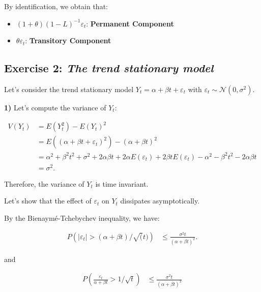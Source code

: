 \documentclass[
  a4paper]{article}
\begin{document}
By identification, we obtain that:

\begin{itemize}
    \item $(1 + \theta)(1 - L)^{-1} \varepsilon_t$: \textbf{Permanent Component}    
    \item $\theta \varepsilon_t$: \textbf{Transitory Component}
\end{itemize}

\hypertarget{exercise-2-the-trend-stationary-model}{%
\subsection{\texorpdfstring{Exercise 2: \emph{The trend stationary
model}}{Exercise 2: The trend stationary model}}\label{exercise-2-the-trend-stationary-model}}

Let's consider the trend stationary model
\(Y_t = \alpha + \beta t + \varepsilon_t\) with
\(\varepsilon_t \sim \mathcal{N}(0, \sigma^2)\).

\textbf{1)} Let's compute the variance of \(Y_t\):

\begin{align*}
V(Y_t) & = E(Y_t^2) - E(Y_t)^2 \\
       & = E((\alpha + \beta t + \varepsilon_t)^2) - (\alpha + \beta t)^2 \\
       & = \alpha^2 + \beta^2 t^2 + \sigma^2 + 2 \alpha \beta t + 2 \alpha E(\varepsilon_t) + 2 \beta t E(\varepsilon_t) - \alpha^2 - \beta^2 t^2 - 2 \alpha \beta t \\
       & = \sigma^2.
\end{align*}

Therefore, the variance of \(Y_t\) is time invariant.

Let's show that the effect of \(\varepsilon_t\) on \(Y_t\) dissipates
asymptotically.

By the Bienaymé-Tchebychev inequality, we have:

\begin{align*}
P\left(\left| \varepsilon_t \right|  > (\alpha + \beta t) / \sqrt(t) \right) & \leq \frac{\sigma^2 t}{(\alpha + \beta t)^2}.
\end{align*}

and

\begin{align*}
P\left(\frac{\varepsilon_t}{\alpha + \beta t} > 1/\sqrt{t} \right) & \leq \frac{\sigma^2 t}{(\alpha + \beta t)^2} \\
\end{align*}
\end{document}
